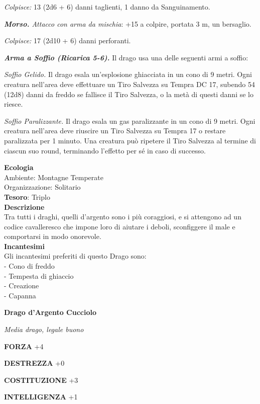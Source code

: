 \begin{multicols}{2}
	\textit{Colpisce:} 13 (2d6 + 6) danni taglienti, 1 danno da Sanguinamento.

	\textit{\textbf{Morso.} Attacco con arma da mischia}: +15 a colpire, portata 3 m, un bersaglio.

	\textit{Colpisce:} 17 (2d10 + 6) danni perforanti.

	\textit{\textbf{Arma a Soffio (Ricarica 5-6).}} Il drago usa una delle seguenti armi a soffio:

	\textit{Soffio Gelido.} Il drago esala un'esplosione ghiacciata in un cono di 9 metri. Ogni creatura nell'area deve effettuare un Tiro Salvezza su Tempra DC 17, subendo 54 (12d8) danni da freddo se fallisce il Tiro Salvezza, o la metà di questi danni se lo riesce.

	\textit{Soffio Paralizzante.} Il drago esala un gas paralizzante in un cono di 9 metri. Ogni creatura nell'area deve riuscire un Tiro Salvezza su Tempra 17 o restare paralizzata per 1 minuto. Una creatura può ripetere il Tiro Salvezza al termine di ciascun suo round, terminando l'effetto per sé in caso di successo.

	\textbf{Ecologia}\\
	Ambiente: Montagne Temperate\\
	Organizzazione: Solitario\\
	\textbf{Tesoro}: Triplo\\
	\textbf{Descrizione}\\
	Tra tutti i draghi, quelli d'argento sono i più coraggiosi, e si attengono ad un codice cavalleresco che impone loro di aiutare i deboli, sconfiggere il male e comportarsi in modo onorevole.\\
	\textbf{Incantesimi}\\
	Gli incantesimi preferiti di questo Drago sono:\\
	- Cono di freddo\\
	- Tempesta di ghiaccio\\
	- Creazione\\
	- Capanna

	\medskip{}\textbf{Drago d'Argento Cucciolo}

	\textit{Media drago, legale buono}

	\textbf{FORZA} +4

	\textbf{DESTREZZA} +0

	\textbf{COSTITUZIONE} +3

	\textbf{INTELLIGENZA} +1


\end{multicols}
